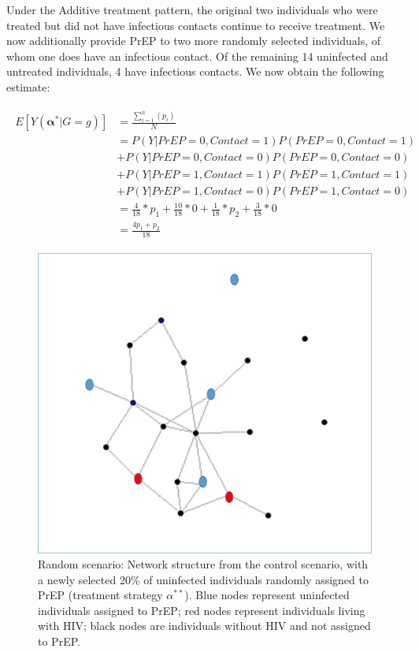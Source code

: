 \documentclass{article}
\theoremstyle{definition}
\begin{document}
Under the Additive treatment pattern, the original two individuals who were treated but did not have infectious contacts continue to receive treatment. We now additionally provide PrEP to two more randomly selected individuals, of whom one does have an infectious contact. Of the remaining 14 uninfected and untreated individuals, 4 have infectious contacts. We now obtain the following estimate: 

\begin{align}
\begin{split}
E[Y\left(\mathbf{\alpha^*}|G=g\right)] & = \frac{\sum_{i=1}^{n}(p_{i})}{N}  \\ 
& = P\left(Y|PrEP = 0, Contact = 1\right)P\left(PrEP = 0, Contact = 1\right)  \\ \nonumber
& +P\left(Y|PrEP = 0, Contact = 0\right)P\left(PrEP = 0, Contact = 0\right)  \\ \nonumber
& +P\left(Y|PrEP = 1, Contact = 1\right)P\left(PrEP = 1, Contact = 1\right) \\ \nonumber
&  +P\left(Y|PrEP = 1, Contact = 0\right)P\left(PrEP = 1, Contact = 0\right) \\ \nonumber
 &= \frac{4}{18}*p_1 +  \frac{10}{18}*0 +\frac{1}{18}*p_2 +  \frac{3}{18}*0\\ \nonumber
 &=\frac{4p_1+p_2}{18}  \nonumber
 \end{split}
\end{align}

\begin{figure}[H]
    \centering
    \includegraphics[scale=0.5]{Original Figures/Network Example 3.png}
    \caption{Random scenario: Network structure from the control scenario, with a newly selected 20\%  of uninfected individuals randomly assigned to PrEP  (treatment strategy $\alpha^{**}$). Blue nodes represent uninfected individuals assigned to PrEP; red nodes represent individuals living with HIV; black nodes are individuals without HIV and not assigned to PrEP.}
    \label{fig:Figure 6}
\end{figure}
\end{document}
